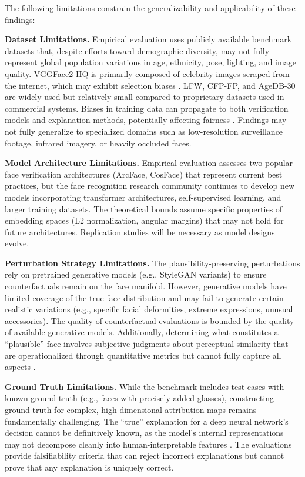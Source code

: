 The following limitations constrain the generalizability and applicability of these findings:

\textbf{Dataset Limitations.} Empirical evaluation uses publicly available benchmark datasets that, despite efforts toward demographic diversity, may not fully represent global population variations in age, ethnicity, pose, lighting, and image quality. VGGFace2-HQ is primarily composed of celebrity images scraped from the internet, which may exhibit selection biases \cite{cao2018vggface2}. LFW, CFP-FP, and AgeDB-30 are widely used but relatively small compared to proprietary datasets used in commercial systems. Biases in training data can propagate to both verification models and explanation methods, potentially affecting fairness \cite{buolamwini2018gender}. Findings may not fully generalize to specialized domains such as low-resolution surveillance footage, infrared imagery, or heavily occluded faces.

\textbf{Model Architecture Limitations.} Empirical evaluation assesses two popular face verification architectures (ArcFace, CosFace) that represent current best practices, but the face recognition research community continues to develop new models incorporating transformer architectures, self-supervised learning, and larger training datasets. The theoretical bounds assume specific properties of embedding spaces (L2 normalization, angular margins) that may not hold for future architectures. Replication studies will be necessary as model designs evolve.

\textbf{Perturbation Strategy Limitations.} The plausibility-preserving perturbations rely on pretrained generative models (e.g., StyleGAN variants) to ensure counterfactuals remain on the face manifold. However, generative models have limited coverage of the true face distribution and may fail to generate certain realistic variations (e.g., specific facial deformities, extreme expressions, unusual accessories). The quality of counterfactual evaluations is bounded by the quality of available generative models. Additionally, determining what constitutes a ``plausible'' face involves subjective judgments about perceptual similarity that are operationalized through quantitative metrics but cannot fully capture all aspects \cite{zhang2018lpips}.

\textbf{Ground Truth Limitations.} While the benchmark includes test cases with known ground truth (e.g., faces with precisely added glasses), constructing ground truth for complex, high-dimensional attribution maps remains fundamentally challenging. The ``true'' explanation for a deep neural network's decision cannot be definitively known, as the model's internal representations may not decompose cleanly into human-interpretable features \cite{olah2018circuits,lipton2018mythos}. The evaluations provide falsifiability criteria that can reject incorrect explanations but cannot prove that any explanation is uniquely correct.

